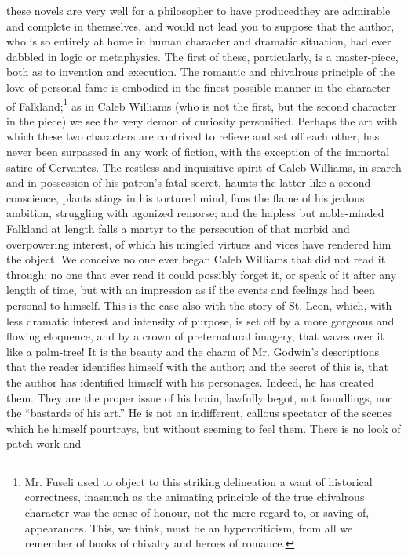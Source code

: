 these novels are very well for a philosopher to have
produced\textemdash they are admirable and complete in themselves,
and would not lead you to suppose that the author, who is so
entirely at home in human character and dramatic situation, had
ever dabbled in logic or metaphysics. The first of these,
particularly, is a master-piece, both as to invention and
execution. The romantic and chivalrous principle of the love of
personal fame is embodied in the finest possible manner in the
character of Falkland;\footnote{Mr. Fuseli used to object to this
striking delineation a want of historical correctness, inasmuch as
the animating principle of the true chivalrous character was the
sense of honour, not the mere regard to, or saving of,
appearances. This, we think, must be an hypercriticism, from all
we remember of books of chivalry and heroes of romance.} as in
Caleb Williams (who is not the first, but the second character in
the piece) we see the very demon of curiosity personified. Perhaps
the art with which these two characters are contrived to relieve
and set off each other, has never been surpassed in any work of
fiction, with the exception of the immortal satire of
Cervantes. The restless and inquisitive spirit of Caleb Williams,
in search and in possession of his patron's fatal secret, haunts
the latter like a second conscience, plants stings in his tortured
mind, fans the flame of his jealous ambition, struggling with
agonized remorse; and the hapless but noble-minded Falkland at
length falls a martyr to the persecution of that morbid and
overpowering interest, of which his mingled virtues and vices have
rendered him the object. We conceive no one ever began Caleb
Williams that did not read it through: no one that ever read it
could possibly forget it, or speak of it after any length of time,
but with an impression as if the events and feelings had been
personal to himself.  This is the case also with the story of
St. Leon, which, with less dramatic interest and intensity of
purpose, is set off by a more gorgeous and flowing eloquence, and
by a crown of preternatural imagery, that waves over it like a
palm-tree! It is the beauty and the charm of Mr. Godwin's
descriptions that the reader identifies himself with the author;
and the secret of this is, that the author has identified himself
with his personages. Indeed, he has created them. They are the
proper issue of his brain, lawfully begot, not foundlings, nor the
``bastards of his art.'' He is not an indifferent, callous
spectator of the scenes which he himself pourtrays, but without
seeming to feel them.  There is no look of patch-work and
